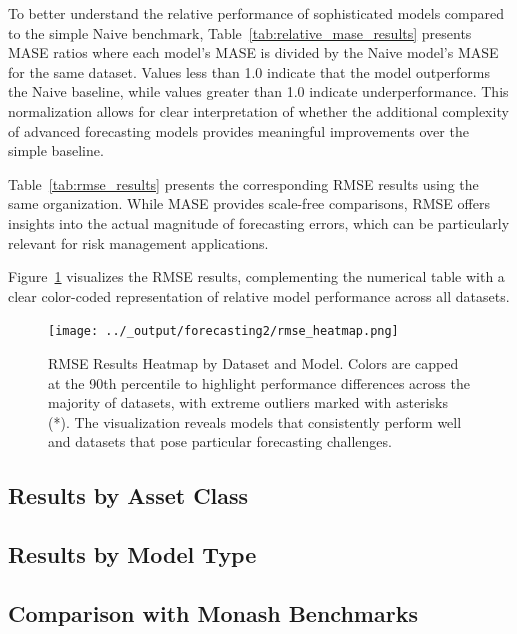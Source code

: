 \documentclass{article}
\begin{document}
To better understand the relative performance of sophisticated models compared to the simple Naive benchmark, Table~\ref{tab:relative_mase_results} presents MASE ratios where each model's MASE is divided by the Naive model's MASE for the same dataset. Values less than 1.0 indicate that the model outperforms the Naive baseline, while values greater than 1.0 indicate underperformance. This normalization allows for clear interpretation of whether the additional complexity of advanced forecasting models provides meaningful improvements over the simple baseline.



Table~\ref{tab:rmse_results} presents the corresponding RMSE results using the same organization. While MASE provides scale-free comparisons, RMSE offers insights into the actual magnitude of forecasting errors, which can be particularly relevant for risk management applications.



Figure~\ref{fig:rmse_heatmap} visualizes the RMSE results, complementing the numerical table with a clear color-coded representation of relative model performance across all datasets.

\begin{figure}[htbp]
\centering
\texttt{[image: ../\_output/forecasting2/rmse\_heatmap.png]}
\caption{RMSE Results Heatmap by Dataset and Model. Colors are capped at the 90th percentile to highlight performance differences across the majority of datasets, with extreme outliers marked with asterisks (*). The visualization reveals models that consistently perform well and datasets that pose particular forecasting challenges.}
\label{fig:rmse_heatmap}
\end{figure}

\subsection{Results by Asset Class}

\subsection{Results by Model Type}

\subsection{Comparison with Monash Benchmarks}
\end{document}
